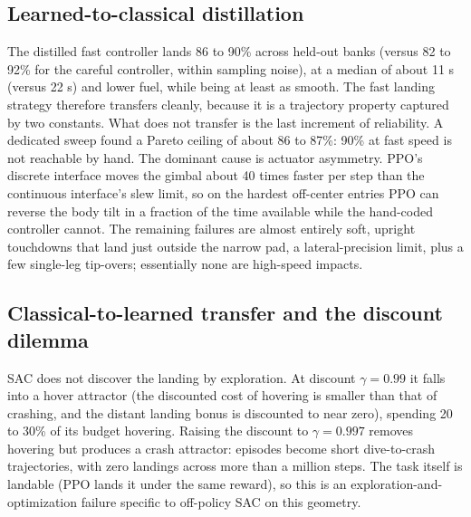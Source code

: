\documentclass[10pt,twocolumn]{article}
\begin{document}
\subsection{Learned-to-classical distillation}
The distilled fast controller lands 86 to 90\% across held-out banks (versus 82 to 92\% for the careful controller, within sampling noise), at a median of about 11 s (versus 22 s) and lower fuel, while being at least as smooth. The fast landing strategy therefore transfers cleanly, because it is a trajectory property captured by two constants. What does not transfer is the last increment of reliability. A dedicated sweep found a Pareto ceiling of about 86 to 87\%: 90\% at fast speed is not reachable by hand. The dominant cause is actuator asymmetry. PPO's discrete interface moves the gimbal about 40 times faster per step than the continuous interface's slew limit, so on the hardest off-center entries PPO can reverse the body tilt in a fraction of the time available while the hand-coded controller cannot. The remaining failures are almost entirely soft, upright touchdowns that land just outside the narrow pad, a lateral-precision limit, plus a few single-leg tip-overs; essentially none are high-speed impacts.

\subsection{Classical-to-learned transfer and the discount dilemma}
\label{sec:sac}
SAC does not discover the landing by exploration. At discount $\gamma=0.99$ it falls into a hover attractor (the discounted cost of hovering is smaller than that of crashing, and the distant landing bonus is discounted to near zero), spending 20 to 30\% of its budget hovering. Raising the discount to $\gamma=0.997$ removes hovering but produces a crash attractor: episodes become short dive-to-crash trajectories, with zero landings across more than a million steps. The task itself is landable (PPO lands it under the same reward), so this is an exploration-and-optimization failure specific to off-policy SAC on this geometry.
\end{document}
